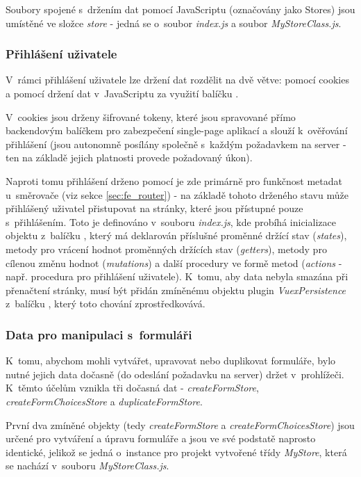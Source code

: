 	Soubory spojené s~držením dat pomocí JavaScriptu (označovány jako Stores) jsou umístěné ve složce \textit{store} - jedná se o~soubor \textit{index.js} a soubor \textit{MyStoreClass.js}.
	
		\subsubsection{Přihlášení uživatele}
		V~rámci přihlášení uživatele lze držení dat rozdělit na dvě větve: pomocí cookies a pomocí držení dat v~JavaScriptu za využití balíčku . 
		
		V~cookies jsou drženy šifrované tokeny, které jsou spravované přímo backendovým balíčkem pro zabezpečení single-page aplikací  a slouží k~ověřování přihlášení (jsou autonomně posílány společně s~každým požadavkem na server - ten na základě jejich platnosti provede požadovaný úkon). 
		
		Naproti tomu přihlášení drženo pomocí  je zde primárně pro funkčnost metadat u~směrovače (viz sekce \ref{sec:fe_router}) - na základě tohoto drženého stavu může přihlášený uživatel přistupovat na stránky, které jsou přístupné pouze s~přihlášením. Toto je definováno v~souboru \textit{index.js}, kde probíhá inicializace objektu z~balíčku , který má deklarován příslušné proměnné držící stav (\textit{states}), metody pro vrácení hodnot proměnných držících stav (\textit{getters}), metody pro cílenou změnu hodnot (\textit{mutations}) a další procedury ve formě metod (\textit{actions} - např. procedura pro přihlášení uživatele). K~tomu, aby data nebyla smazána při přenačtení stránky, musí být přidán zmíněnému objektu plugin \textit{VuexPersistence} z~balíčku , který toto chování zprostředkovává.
		
		\subsubsection{Data pro manipulaci s~formuláři}\label{sec:data_prohlizec_form}
		K~tomu, abychom mohli vytvářet, upravovat nebo duplikovat formuláře, bylo nutné jejich data dočasně (do odeslání požadavku na server) držet v~prohlížeči. K~těmto účelům vznikla tři dočasná  dat - \textit{createFormStore}, \textit{createFormChoicesStore} a \textit{duplicateFormStore}.
		
		První dva zmíněné objekty (tedy \textit{createFormStore} a \textit{createFormChoicesStore}) jsou určené pro vytváření a úpravu formuláře a jsou ve své podstatě naprosto identické, jelikož se jedná o~instance pro projekt vytvořené třídy \textit{MyStore}, která se nachází v~souboru \textit{MyStoreClass.js}. 
		
